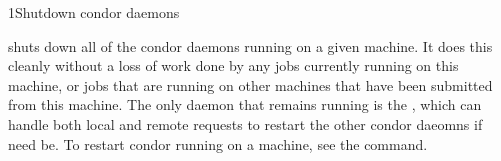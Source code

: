 \begin{ManPage}{}{1}{Shutdown condor daemons}
\label{man-condor-off}
\Synopsis {}

\Description 

 shuts down all of the condor daemons running on a given
machine.  It does this cleanly without a loss of work done by any jobs
currently running on this machine, or jobs that are running on other machines
that have been submitted from this machine.  The only daemon that remains
running is the , which can handle both local and remote
requests to restart the other condor daeomns if need be.  To restart
condor running on a machine, see the  command.


\begin{Options}
\end{Options}

\end{ManPage}
